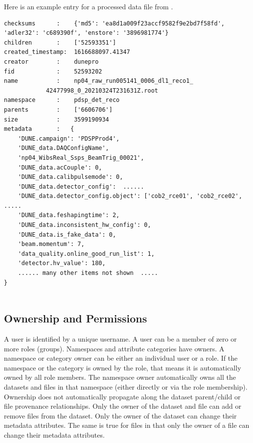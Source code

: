 \documentclass[../main-v1.tex]{subfiles}
\begin{document}

Here is an example  entry for a processed data file from . 
\begin{verbatim}
checksums      :    {'md5': 'ea8d1a009f23accf9582f9e2bd7f58fd', 'adler32': 'c689390f', 'enstore': '3896981774'}
children       :    ['52593351']
created_timestamp:  1616688097.41347
creator        :    dunepro
fid            :    52593202
name           :    np04_raw_run005141_0006_dl1_reco1_
            42477998_0_20210324T231631Z.root
namespace      :    pdsp_det_reco
parents        :    ['6606706']
size           :    3599190934
metadata       :   {
    'DUNE.campaign': 'PDSPProd4',
    'DUNE_data.DAQConfigName',
    'np04_WibsReal_Ssps_BeamTrig_00021',
    'DUNE_data.acCouple': 0,
    'DUNE_data.calibpulsemode': 0,
    'DUNE_data.detector_config':  ...... 
    'DUNE_data.detector_config.object': ['cob2_rce01', 'cob2_rce02', .....
    'DUNE_data.feshapingtime': 2,
    'DUNE_data.inconsistent_hw_config': 0,
    'DUNE_data.is_fake_data': 0,
    'beam.momentum': 7,
    'data_quality.online_good_run_list': 1,
    'detector.hv_value': 180,
    ...... many other items not shown  .....
}


 \end{verbatim}

\subsection{Ownership and Permissions }

A  user  is identified  by a unique username. A user can be a member of zero or more roles (groups). Namespaces and attribute categories have owners. A namespace or category owner can be either an individual user or a role. If the namespace or the category is owned by the role, %
that means it is automatically owned by all role members. 
The namespace owner automatically owns all the datasets and files in that namespace (either directly or via the role membership). Ownership does not automatically propagate along the dataset parent/child or file provenance relationships. 
Only the owner of the dataset and file %
can add or remove files from the dataset. Only the owner of the dataset can change their metadata attributes. The same is true for files in that only the owner of a file can change their metadata attributes. %
\end{document}
